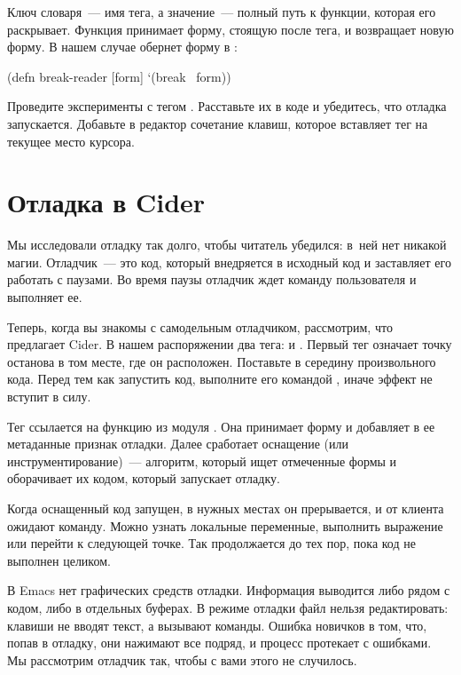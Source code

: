 Ключ словаря~--- имя тега, а значение~--- полный путь к функции, которая его раскрывает. Функция принимает форму, стоящую после тега, и возвращает новую форму. В нашем случае  обернет форму в :

\begin{english}
  \begin{clojure}
(defn break-reader [form]
  `(break ~form))
  \end{clojure}
\end{english}

Проведите эксперименты с тегом . Расставьте их в коде и убедитесь, что отладка запускается. Добавьте в редактор сочетание клавиш, которое вставляет тег на текущее место курсора.

\section{Отладка в Cider}

Мы исследовали отладку так долго, чтобы читатель убедился: в~ней нет никакой магии. Отладчик~--- это код, который внедряется в исходный код и заставляет его работать с паузами. Во время паузы отладчик ждет команду пользователя и выполняет ее.

Теперь, когда вы знакомы с самодельным отладчиком, рассмотрим, что предлагает Cider. В нашем распоряжении два тега:  и . Первый тег означает точку останова в том месте, где он расположен. Поставьте  в середину произвольного кода. Перед тем как запустить код, выполните его командой , иначе эффект не вступит в силу.

Тег  ссылается на функцию  из модуля . Она принимает форму и добавляет в ее метаданные признак отладки. Далее сработает оснащение (или инструментирование)~--- алгоритм, который ищет отмеченные формы и оборачивает их кодом, который запускает отладку.

Когда оснащенный код запущен, в нужных местах он прерывается, и от клиента ожидают команду. Можно узнать локальные переменные, выполнить выражение или перейти к следующей точке. Так продолжается до тех пор, пока код не выполнен целиком.

В Emacs нет графических средств отладки. Информация выводится либо рядом с кодом, либо в отдельных буферах. В режиме отладки файл нельзя редактировать: клавиши не вводят текст, а вызывают команды. Ошибка новичков в том, что, попав в отладку, они нажимают все подряд, и процесс протекает с ошибками. Мы рассмотрим отладчик так, чтобы с вами этого не случилось.

